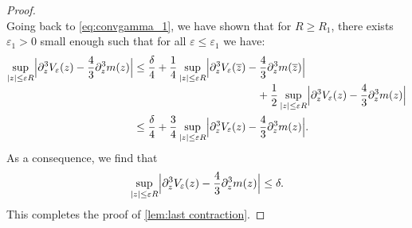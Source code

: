 \documentclass[JEP,XML,SOM,Unicode]{cedram}
\theoremstyle{plain}
\theoremstyle{definition}
\let\eps\varepsilon
\let\ds\displaystyle
\newcommand{\abs}[1]{\left\lvert#1\right\rvert}
\newcommand{\Babs}[1]{\Bigl\lvert#1\Bigr\rvert}
\newcommand{\bz}{\overline{z}}
\begin{document}
\begin{proof}
\begin{equation*}
\end{equation*}
Going back to \eqref{eq:convgamma_1}, we have shown that for $R\geq R_1$, there exists $\eps_1>0$ small enough such that for all $\eps \leq \eps_1$ we have:
\begin{align*}
\ds \sup_{\abs{z} \leq \eps R} \Babs{ \partial_z^3 V_\eps(z)- \frac43 \partial_z^3 m(z) }
& \leq \ds \frac\delta4 + \dfrac{1}{4} \sup_{\abs{z} \leq \eps R} \Babs{ \partial_z^3 V_\eps(\bz)- \frac43 \partial_z^3 m(\bz)}\\[-3pt]
&\hspace*{4cm} +
\dfrac{1}{2}\sup_{\abs{z} \leq \eps R} \Babs{ \partial_z^3 V_\eps(z)- \frac43 \partial_z^3 m(z)} \\
& \leq \frac\delta4 + \dfrac{3}{4} \sup_{\abs{z} \leq \eps R} \Babs{ \partial_z^3 V_\eps(z)- \frac43 \partial_z^3 m(z)}.
\end{align*}
As a consequence, we find that
\begin{align*}
\sup_{\abs{z} \leq \eps R} \Babs{ \partial_z^3 V_\eps(z)- \frac43 \partial_z^3 m(z) } \leq \delta.
\end{align*}
This completes the proof of \cref{lem:last contraction}.
\end{proof}
\end{document}
